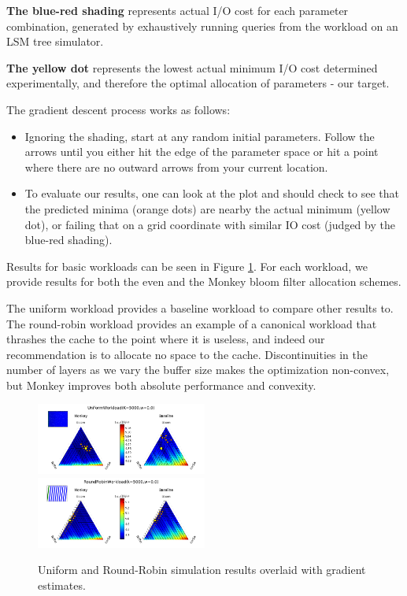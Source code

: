 \documentclass{cidr-2019}
\begin{document}
\textbf{The blue-red shading} represents actual I/O cost for each parameter
combination, generated by exhaustively running queries from the workload on an
LSM tree simulator.

\textbf{The yellow dot} represents the lowest actual minimum I/O cost
determined experimentally, and therefore the optimal allocation of parameters -
our target.

The gradient descent process works as follows:

\begin{itemize}
\setlength{\itemsep}{0pt}
\setlength{\parskip}{0pt}
\setlength{\parsep}{0pt}
\item Ignoring the shading, start at any random initial parameters. Follow the
    arrows until you either hit the edge of the parameter space or hit a point
        where there are no outward arrows from your current location.
\item To evaluate our results, one can look at the plot and should check to see
    that the predicted minima (orange dots) are nearby the actual minimum
        (yellow dot), or failing that on a grid coordinate with similar IO cost
        (judged by the blue-red shading).
\end{itemize}

Results for basic workloads can be seen in Figure \ref{fig:basicquiv}. For each
workload, we provide results for both the even and the Monkey bloom filter
allocation schemes.

The uniform workload provides a baseline workload to compare other results to.
The round-robin workload provides an example of a canonical workload that
thrashes the cache to the point where it is useless, and indeed our
recommendation is to allocate no space to the cache. Discontinuities in the
number of layers as we vary the buffer size makes the optimization
non-convex, but Monkey improves both absolute performance and convexity.

\begin{figure}[!htb]
\begin{center}
\includegraphics[width=0.5\textwidth]{uniformquiv1.png}
\includegraphics[width=0.5\textwidth]{robinquiv1.png}
\end{center}
\caption{Uniform and Round-Robin simulation results overlaid with gradient
    estimates.}
\label{fig:basicquiv}
\end{figure}
\end{document}
